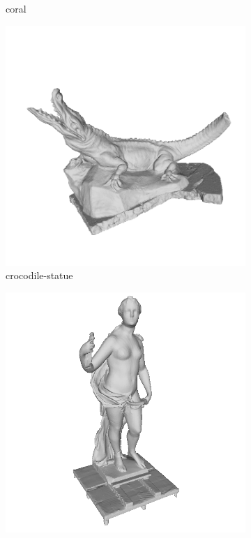 \begin{figure}
\begin{subfigure}[b]{0.23\linewidth}
		\caption{coral}
	\end{subfigure}
	\begin{subfigure}[b]{0.23\linewidth}
		\includegraphics[width=\linewidth]{./Figures/train-dataset/14.crocodile-statue.png}
		\caption{crocodile-statue}
	\end{subfigure}
	\begin{subfigure}[b]{0.23\linewidth}
		\includegraphics[width=\linewidth]{./Figures/train-dataset/15.diane.png}

\end{subfigure}
\end{figure}
